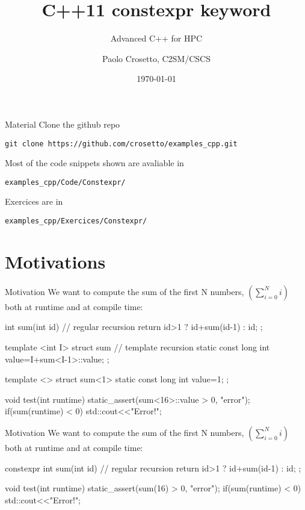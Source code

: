 \documentclass[aspectratio=43]{beamer}
\author{Paolo Crosetto, C2SM/CSCS}
\title{C++11 constexpr keyword}
\subtitle{Advanced C++ for HPC}
\date{\today}
\begin{document}
\cscstitle



\begin{frame}[fragile]{Material}
  Clone the github repo
\begin{verbatim}
git clone https://github.com/crosetto/examples_cpp.git
\end{verbatim}
  Most of the code snippets shown are avaliable in
\begin{verbatim}
examples_cpp/Code/Constexpr/
\end{verbatim}
  Exercices are in
\begin{verbatim}
examples_cpp/Exercices/Constexpr/
\end{verbatim}
\end{frame}

\section{Motivations}


\begin{frame}[fragile]{Motivation}
  We want to compute the sum of the first N numbers, $\left(\sum_{i=0}^N i\right)$ both at runtime and at compile time:
  \begin{Cpplisting}{}
int sum(int id){ // regular recursion
  return id>1 ? id+sum(id-1) : id;
};

template <int I>
struct sum{ // template recursion
  static const long int value=I+sum<I-1>::value;
};

template <>
struct sum<1>{
  static const long int value=1;
};

void test(int runtime){
  static_assert(sum<16>::value > 0, "error");
  if(sum(runtime) < 0) std::cout<<"Error!\n";
}
\end{Cpplisting}
\end{frame}

\begin{frame}[fragile]{Motivation}
  We want to compute the sum of the first N numbers, $\left(\sum_{i=0}^N i\right)$ both at runtime and at compile time:
  \begin{Cpplisting}{}
constexpr int sum(int id){ // regular recursion
  return id>1 ? id+sum(id-1) : id;
};











void test(int runtime){
  static_assert(sum(16) > 0, "error");
  if(sum(runtime) < 0) std::cout<<"Error!\n";
}
\end{Cpplisting}

\end{frame}
\end{document}

